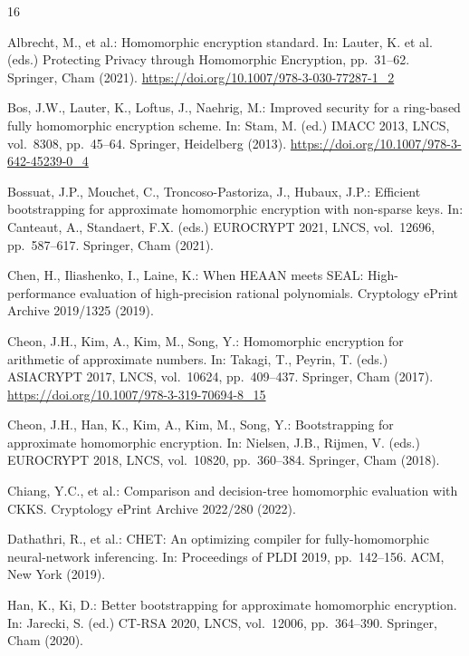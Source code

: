 \documentclass[runningheads]{llncs}
\begin{document}
\begin{thebibliography}{16}

Albrecht, M., et al.:
Homomorphic encryption standard.
In: Lauter, K. et al. (eds.) Protecting Privacy through Homomorphic Encryption, pp.~31--62.
Springer, Cham (2021).
\href{https://doi.org/10.1007/978-3-030-77287-1_2}
     {https://doi.org/10.1007/978-3-030-77287-1\_2}

Bos, J.W., Lauter, K., Loftus, J., Naehrig, M.:
Improved security for a ring-based fully homomorphic encryption scheme.
In: Stam, M. (ed.) IMACC 2013, LNCS, vol.~8308, pp.~45--64.
Springer, Heidelberg (2013).
\href{https://doi.org/10.1007/978-3-642-45239-0_4}
     {https://doi.org/10.1007/978-3-642-45239-0\_4}

Bossuat, J.P., Mouchet, C., Troncoso-Pastoriza, J., Hubaux, J.P.:
Efficient bootstrapping for approximate homomorphic encryption with
non-sparse keys.
In: Canteaut, A., Standaert, F.X. (eds.) EUROCRYPT 2021, LNCS, vol.~12696,
pp.~587--617. Springer, Cham (2021).

Chen, H., Iliashenko, I., Laine, K.:
When HEAAN meets SEAL: High-performance evaluation of high-precision rational polynomials.
Cryptology ePrint Archive 2019/1325 (2019).

Cheon, J.H., Kim, A., Kim, M., Song, Y.:
Homomorphic encryption for arithmetic of approximate numbers.
In: Takagi, T., Peyrin, T. (eds.) ASIACRYPT 2017, LNCS, vol.~10624,
pp.~409--437. Springer, Cham (2017).
\href{https://doi.org/10.1007/978-3-319-70694-8_15}
     {https://doi.org/10.1007/978-3-319-70694-8\_15}

Cheon, J.H., Han, K., Kim, A., Kim, M., Song, Y.:
Bootstrapping for approximate homomorphic encryption.
In: Nielsen, J.B., Rijmen, V. (eds.) EUROCRYPT 2018, LNCS, vol.~10820,
pp.~360--384. Springer, Cham (2018).

Chiang, Y.C., et al.:
Comparison and decision-tree homomorphic evaluation with CKKS.
Cryptology ePrint Archive 2022/280 (2022).

Dathathri, R., et al.:
CHET: An optimizing compiler for fully-homomorphic neural-network inferencing.
In: Proceedings of PLDI 2019, pp.~142--156. ACM, New York (2019).

Han, K., Ki, D.:
Better bootstrapping for approximate homomorphic encryption.
In: Jarecki, S. (ed.) CT-RSA 2020, LNCS, vol.~12006, pp.~364--390.
Springer, Cham (2020).


\end{thebibliography}
\end{document}
